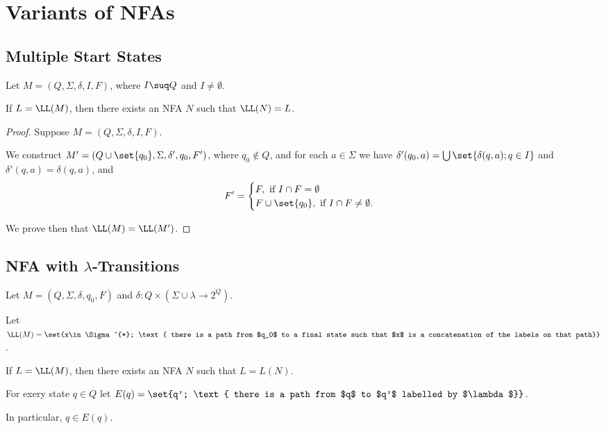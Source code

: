 \documentclass[11pt]{scrartcl}
\begin{document}
\section{Variants of NFAs}

\subsection{Multiple Start States}

Let $M = (Q, \Sigma, \delta, I, F)$, where $I\suq Q$ and $ I \neq \emptyset$.

\begin{theorem}
If $L = \LL(M)$, then there exists an NFA $N$ such that $\LL(N) = L$.
\end{theorem}

\begin{proof}
  \hfill

Suppose $M = (Q, \Sigma, \delta, I, F)$.

We construct $M' = (Q\cup \set{q_0}, \Sigma, \delta', q_0, F')$, where
$q_0\not \in Q$, and for each $a\in \Sigma$ we have $\delta'(q_0, a) = \bigcup \set{\delta(q, a); q\in I}$ and $\delta'(q, a) = \delta(q, a)$, and
\begin{equation*}
  F' = \begin{cases}
    F, \text{ if } I\cap F = \emptyset\\
    F\cup \set{q_0}, \text{ if } I\cap F \neq \emptyset.
  \end{cases}
\end{equation*}

We prove then that $\LL(M) = \LL(M')$.
\end{proof}

\subsection{NFA with $\lambda$-Transitions}

Let $M = (Q, \Sigma, \delta, q_0, F)$ and
$\delta: Q \times (\Sigma\cup {\lambda} \to 2^Q)$.

Let $\LL(M) = \set{x\in \Sigma^{*}; \text{ there is a path from $q_0$ to a final state such that $x$ is a concatenation of the labels on that path}}$.

If $L = \LL(M)$, then there exists an NFA $N$ such that $L = L(N)$.

For exery state $q\in Q$ let $E(q) = \set{q'; \text{ there is a path from $q$ to $q'$ labelled by $\lambda$}}$.

In particular, $q\in E(q)$.
\end{document}
